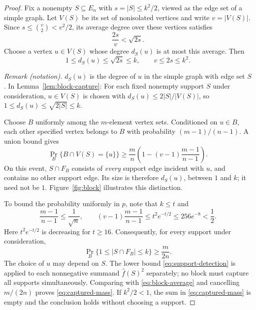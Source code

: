 \begin{proof}
Fix a nonempty $S\subseteq E_n$ with $s=|S|\le k^2/2$, viewed as
the edge set of a simple graph.  Let $V(S)$ be its set of nonisolated
vertices and write $v=|V(S)|$.  Since $s\le\binom v2<v^2/2$, its
average degree over these vertices satisfies
\[
 \frac{2s}{v}<\sqrt{2s}.
\]
Choose a vertex $u\in V(S)$ whose degree $d_S(u)$ is at most this average.  Then
\begin{equation}
 1\le d_S(u)\le\sqrt{2s}\le k,
 \qquad v\le2s\le k^2.
 \label{eq:support-degree}
\end{equation}

\noindent\textit{Remark (notation).} $d_S(u)$ is the degree of $u$ in the simple graph with edge set $S$. In Lemma~\ref{lem:block-capture}: For each fixed nonempty support $S$ under consideration, $u\in V(S)$ is chosen with $d_S(u)\le 2|S|/|V(S)|$, so $1\le d_S(u)\le\sqrt{2|S|}\le k$.


Choose $B$ uniformly among the $m$-element vertex sets.  Conditioned
on $u\in B$, each other specified vertex belongs to $B$ with
probability $(m-1)/(n-1)$.  A union bound gives
\begin{equation}
 \Pr_B\{B\cap V(S)=\{u\}\}
 \ge \frac mn
 \left(1-(v-1)\frac{m-1}{n-1}\right).
 \label{eq:one-vertex-event}
\end{equation}
On this event, $S\cap F_B$ consists of \emph{every} support edge
incident with $u$, and contains no other support edge.  Its size is
therefore $d_S(u)$, between $1$ and $k$; it need not be $1$.
Figure~\ref{fig:block} illustrates this distinction.



To bound the probability uniformly in $p$, note that $k\le t$ and
\[
 \frac{m-1}{n-1}\le\frac1{\sqrt n},
 \qquad
 (v-1)\frac{m-1}{n-1}
 \le t^2e^{-t/2}\le256e^{-8}<\frac12.
\]
Here $t^2e^{-t/2}$ is decreasing for $t\ge16$.
Consequently, for every support under consideration,
\begin{equation}
 \Pr_B\{1\le|S\cap F_B|\le k\}\ge\frac{m}{2n}.
 \label{eq:support-detection}
\end{equation}
The choice of $u$ may depend on $S$.  The lower bound
\eqref{eq:support-detection} is applied to each nonnegative summand
$\widehat f(S)^2$ separately; no block must capture all supports
simultaneously.  Comparing with \eqref{eq:block-average} and
cancelling $m/(2n)$ proves \eqref{eq:captured-mass}.
If $k^2/2<1$, the sum in \eqref{eq:captured-mass} is empty and the
conclusion holds without choosing a support.
\end{proof}

